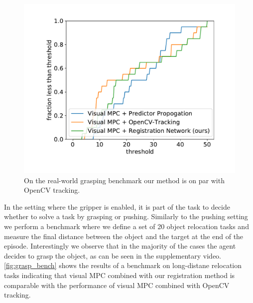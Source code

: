 \begin{figure}
\vspace{-0.3in}
\centering
\includegraphics[width=0.35\columnwidth]{images/grasping_score_cdf.pdf}
\caption{\small{On the real-world grasping benchmark our method is on par with OpenCV tracking.}}
\label{fig:grasp_bench}
\vspace{-0.3in}
\end{figure}

In the setting where the gripper is enabled, it is part of the task to decide whether to solve a task by grasping or pushing. Similarly to the pushing setting we perform a benchmark where we define a set of 20 object relocation tasks and measure the final distance between the object and the target at the end of the episode. Interestingly we observe that in the majority of the cases the agent decides to grasp the object, as can be seen in the supplementary video. \autoref{fig:grasp_bench} shows the results of a benchmark on long-distane relocation tasks indicating that visual MPC combined with our registration method is comparable with the performance of visual MPC combined with OpenCV tracking. 